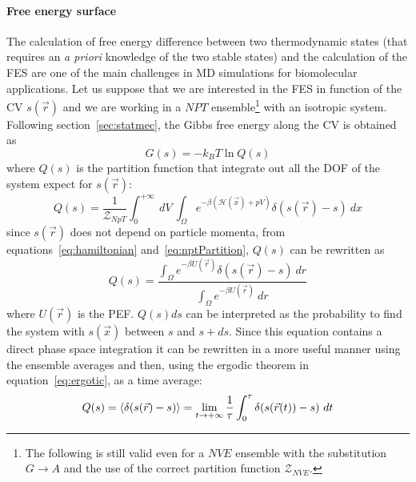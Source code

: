 \paragraph{\textbf{Free energy surface}} The calculation of free energy difference between two thermodynamic 
states (that requires an \textit{a priori} knowledge of the two stable states) and the calculation of the 
\ac{FES} are one of the main challenges in \ac{MD} simulations for biomolecular applications. Let us suppose that 
we are interested in the \ac{FES} in function of the \ac{CV} $s(\vec r)$ and we are working in a $NPT$ 
ensemble\footnote{The following is still valid even for a $NVE$ ensemble with the substitution $G\rightarrow A$ 
and the use of the correct partition function $\mathcal{Z}_{NVE}$.} with an isotropic system. Following 
section~\ref{sec:statmec}, the Gibbs free energy along the \ac{CV} is obtained as
\begin{equation}
	G(s) = -k_BT \ln Q(s)
	\label{eq:fes}
\end{equation}
where $Q(s)$ is the partition function that integrate out all the \ac{DOF} of the system expect for $s(\vec r)$:
\begin{equation*}
	Q(s) = \frac{1}{\mathcal{Z}_{NpT}} \int_0^{+\infty}\ dV \ \int_\Omega e^{-\beta(\mathcal{H}(\vec x) + pV)}\delta(s(\vec r) - s)\ dx
\end{equation*}
since $s(\vec r)$ does not depend on particle momenta, from equations~\eqref{eq:hamiltonian} 
and~\eqref{eq:nptPartition}, $Q(s)$ can be rewritten as
\begin{equation}
	Q(s) =  \frac{ \int_\Omega e^{-\beta U(\vec r)}\delta(s(\vec r) - s)\ dr }{\int_\Omega e^{-\beta U(\vec r)}\ dr}
	\label{eq:CVprobability}
\end{equation}
where $U(\vec r)$ is the \ac{PEF}. $Q(s)ds$ can be interpreted as the probability to find the system with 
$s(\vec x)$ between $s$ and $s + ds$. Since this equation contains a direct phase space integration it can be 
rewritten in a more useful manner using the ensemble averages and then, using the ergodic theorem in 
equation~\eqref{eq:ergotic}, as a time average:
\begin{equation}
	Q(s) = \left \langle \delta(s(\vec r) - s) \right \rangle = \lim_{t\to +\infty}\frac{1}{\tau}\int_0^\tau \delta(s(\vec r(t)) - s)\ dt
	\label{eq:CVprobabilityAve}
\end{equation}

